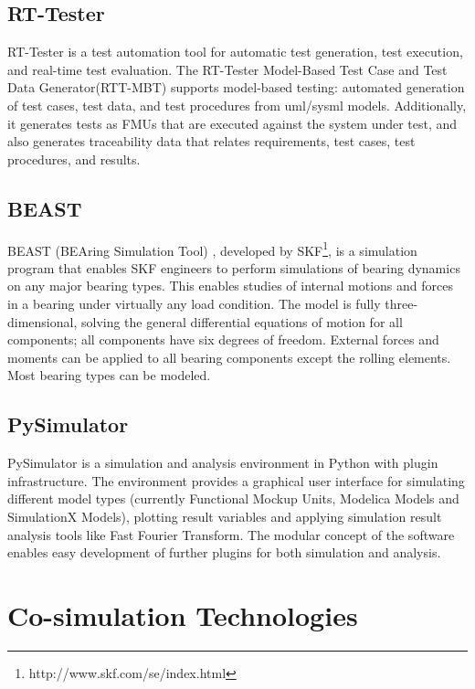 \subsection{RT-Tester}
\label{sec:rttester}

RT-Tester \cite{rttester,rttester11} is a test automation tool for automatic test generation, test execution, and real-time test evaluation. The RT-Tester Model-Based Test Case and Test Data Generator(RTT-MBT) \cite{rttester,rttester13} supports model-based testing: automated generation of test cases, test data, and test procedures from \acrshort{uml}/\acrshort{sysml} models. Additionally, it generates tests as FMUs that are executed against the system under test, and also generates traceability data that relates requirements, test cases, test procedures, and results.

\subsection{BEAST}
\label{sec:beast}

BEAST (BEAring Simulation Tool) \cite{beast}, developed by SKF\footnote{http://www.skf.com/se/index.html}, is a simulation program that enables SKF engineers to perform simulations of bearing dynamics on any major bearing types. This enables studies of internal motions and forces in a bearing under virtually any load condition. The model is fully three-dimensional, solving the general differential equations of motion for all components; all components have six degrees of freedom. External forces and moments can be applied to all bearing components except the rolling elements. Most bearing types can be modeled.

\subsection{PySimulator}
\label{sec:pysimulator}

PySimulator \cite{pysimulator} is a simulation and analysis environment in Python with plugin infrastructure. The environment provides a graphical user interface for simulating different model types (currently Functional Mockup Units, Modelica Models and SimulationX Models), plotting result variables and applying simulation result analysis tools like Fast Fourier Transform. The modular concept of the software enables easy development of further plugins for both simulation and analysis. 

\section{Co-simulation Technologies}
\label{sec:cosimulaiton}


